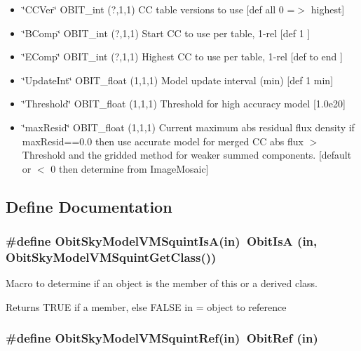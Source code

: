 \begin{itemize}
(4,1,1) Point other parameters [def all 0.0] \item \char`\"{}CCVer\char`\"{} OBIT\_\-int (?,1,1) CC table versions to use [def all 0 =$>$ highest] \item \char`\"{}BComp\char`\"{} OBIT\_\-int (?,1,1) Start CC to use per table, 1-rel [def 1 ] \item \char`\"{}EComp\char`\"{} OBIT\_\-int (?,1,1) Highest CC to use per table, 1-rel [def to end ] \item \char`\"{}Update\-Int\char`\"{} OBIT\_\-float (1,1,1) Model update interval (min) [def 1 min] \item \char`\"{}Threshold\char`\"{} OBIT\_\-float (1,1,1) Threshold for high accuracy model [1.0e20] \item \char`\"{}max\-Resid\char`\"{} OBIT\_\-float (1,1,1) Current maximum abs residual flux density if max\-Resid==0.0 then use accurate model for merged CC abs flux $>$ Threshold and the gridded method for weaker summed components. [default or $<$ 0 then determine from Image\-Mosaic]\end{itemize}


\subsection{Define Documentation}
\subsubsection{\setlength{\rightskip}{0pt plus 5cm}\#define Obit\-Sky\-Model\-VMSquint\-Is\-A(in)\ Obit\-Is\-A (in, Obit\-Sky\-Model\-VMSquint\-Get\-Class())}\label{ObitSkyModelVMSquint_8h_a2}


Macro to determine if an object is the member of this or a derived class. 

Returns TRUE if a member, else FALSE in = object to reference 
\subsubsection{\setlength{\rightskip}{0pt plus 5cm}\#define Obit\-Sky\-Model\-VMSquint\-Ref(in)\ Obit\-Ref (in)}\label{ObitSkyModelVMSquint_8h_a1}


